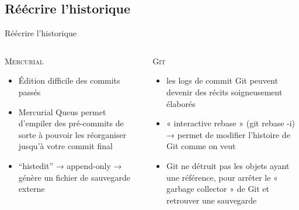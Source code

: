 \subsection{Réécrire l'historique}
\begin{frame}{Réécrire l'historique}
  \begin{columns}[T]

    \begin{column}{.5\textwidth}
     \textsc{Mercurial}

      \begin{itemize}
        \item{Édition difficile des commits passés}
        \item{Mercurial Queus permet d’empiler des pré-commits de sorte à
              pouvoir les réorganiser jusqu’à votre commit final}
        \item{“histedit” → append-only → génère un fichier de sauvegarde externe}
      \end{itemize}
    \end{column}

    \begin{column}{.5\textwidth}
      \textsc{Git}

      \begin{itemize}
        \item{les logs de commit Git peuvent devenir des récits soigneusement
              élaborés}
        \item{« interactive rebase » (git rebase -i) → permet de modifier
              l’histoire de Git comme on veut}
        \item{Git ne détruit pas les objets ayant une référence, pour arrêter
              le « garbage collector » de Git et retrouver une sauvegarde}
      \end{itemize}
    \end{column}

  \end{columns}
\end{frame}

